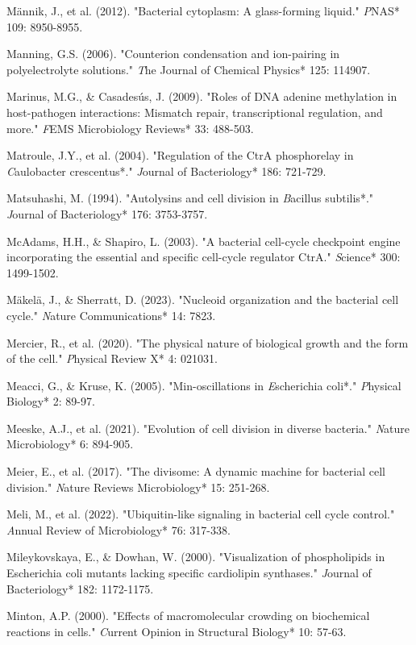 \documentclass[11pt,a4paper]{article}
\begin{document}
Männik, J., et al. (2012). "Bacterial cytoplasm: A glass-forming liquid." \textit*PNAS* 109: 8950-8955.

Manning, G.S. (2006). "Counterion condensation and ion-pairing in polyelectrolyte solutions." \textit*The Journal of Chemical Physics* 125: 114907.

Marinus, M.G., & Casadesús, J. (2009). "Roles of DNA adenine methylation in host-pathogen interactions: Mismatch repair, transcriptional regulation, and more." \textit*FEMS Microbiology Reviews* 33: 488-503.

Matroule, J.Y., et al. (2004). "Regulation of the CtrA phosphorelay in \textit*Caulobacter crescentus*." \textit*Journal of Bacteriology* 186: 721-729.

Matsuhashi, M. (1994). "Autolysins and cell division in \textit*Bacillus subtilis*." \textit*Journal of Bacteriology* 176: 3753-3757.

McAdams, H.H., & Shapiro, L. (2003). "A bacterial cell-cycle checkpoint engine incorporating the essential and specific cell-cycle regulator CtrA." \textit*Science* 300: 1499-1502.

Mäkelä, J., & Sherratt, D. (2023). "Nucleoid organization and the bacterial cell cycle." \textit*Nature Communications* 14: 7823.

Mercier, R., et al. (2020). "The physical nature of biological growth and the form of the cell." \textit*Physical Review X* 4: 021031.

Meacci, G., & Kruse, K. (2005). "Min-oscillations in \textit*Escherichia coli*." \textit*Physical Biology* 2: 89-97.

Meeske, A.J., et al. (2021). "Evolution of cell division in diverse bacteria." \textit*Nature Microbiology* 6: 894-905.

Meier, E., et al. (2017). "The divisome: A dynamic machine for bacterial cell division." \textit*Nature Reviews Microbiology* 15: 251-268.

Meli, M., et al. (2022). "Ubiquitin-like signaling in bacterial cell cycle control." \textit*Annual Review of Microbiology* 76: 317-338.

Mileykovskaya, E., & Dowhan, W. (2000). "Visualization of phospholipids in Escherichia coli mutants lacking specific cardiolipin synthases." \textit*Journal of Bacteriology* 182: 1172-1175.

Minton, A.P. (2000). "Effects of macromolecular crowding on biochemical reactions in cells." \textit*Current Opinion in Structural Biology* 10: 57-63.
\end{document}
